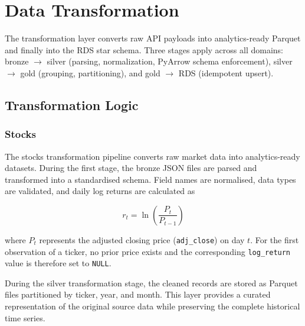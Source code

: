\documentclass[11pt,a4paper]{article}
\begin{document}
\newpage

\section{Data Transformation}
\label{sec:data_transformation}

The transformation layer converts raw API payloads into
analytics-ready Parquet and finally into the RDS star schema. Three
stages apply across all domains: bronze $\to$ silver (parsing,
normalization, PyArrow schema enforcement), silver $\to$ gold
(grouping, partitioning), and gold $\to$ RDS (idempotent upsert).

\subsection{Transformation Logic}
\label{sec:transformation_logic}

\subsubsection{Stocks}
\label{sec:stocks_transform}

The stocks transformation pipeline converts raw market data into
analytics-ready datasets. During the first stage, the bronze JSON
files are parsed and transformed into a standardised schema. Field
names are normalised, data types are validated, and daily log returns
are calculated as

\[
r_t = \ln\left(\frac{P_t}{P_{t-1}}\right)
\]

where \(P_t\) represents the adjusted closing price
(\texttt{adj\_close}) on day \(t\). For the first observation of a
ticker, no prior price exists and the corresponding
\texttt{log\_return} value is therefore set to \texttt{NULL}.

During the silver transformation stage, the cleaned records are stored
as Parquet files partitioned by ticker, year, and month. This layer
provides a curated representation of the original source data while
preserving the complete historical time series.
\end{document}
